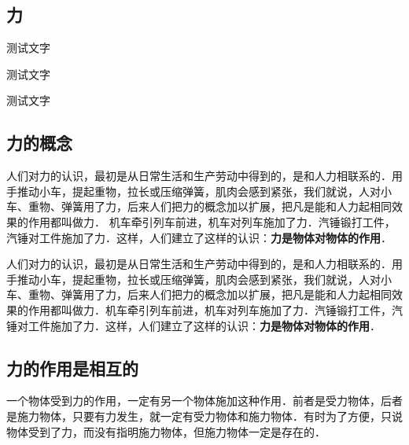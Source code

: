 \begin{Topic}

\section{力}

\begin{Point*}
\zhlipsum[2]
\end{Point*}


\begin{Case*}
	\item 测试文字
	\item 测试文字
	\item 测试文字
\end{Case*}

\begin{Paracol}
\subsection{力的概念}

人们对力的认识，最初是从日常生活和生产劳动中得到的，是和人力相联系的．用手推动小车，提起重物，拉长或压缩弹簧，肌肉会感到紧张，我们就说，人对小车、重物、弹簧用了力，后来人们把力的概念加以扩展，把凡是能和人力起相同效果的作用都叫做力．
机车牵引列车前进，机车对列车施加了力．汽锤锻打工件，汽锤对工件施加了力．这样，人们建立了这样的认识：\textbf{力是物体对物体的作用}．



人们对力的认识，最初是从日常生活和生产劳动中得到的，是和人力相联系的．用手推动小车，提起重物，拉长或压缩弹簧，肌肉会感到紧张，我们就说，人对小车、重物、弹簧用了力，后来人们把力的概念加以扩展，把凡是能和人力起相同效果的作用都叫做力．机车牵引列车前进，机车对列车施加了力．汽锤锻打工件，汽锤对工件施加了力．这样，人们建立了这样的认识：\textbf{力是物体对物体的作用}．





\subsection{力的作用是相互的}

一个物体受到力的作用，一定有另一个物体施加这种作用．前者是受力物体，后者是施力物体，只要有力发生，就一定有受力物体和施力物体．有时为了方便，只说物体受到了力，而没有指明施力物体，但施力物体一定是存在的．






\end{Paracol}
\end{Topic}

